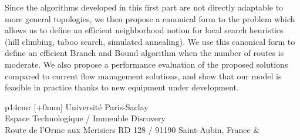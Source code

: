 \begin{mdframed}[linecolor=Prune,linewidth=1]
\begin{small}
\begin{multicols}{2}
Since the algorithms developed in this first part are not directly adaptable to more general topologies, we then propose a canonical form to the problem which allows us to define an efficient neighborhood notion for local search heuristics (hill climbing, taboo search, simulated annealing). We use this canonical form to define an efficient Branch and Bound algorithm when the number of routes is moderate.
We also propose a performance evaluation of the proposed solutions compared to current flow management solutions, and show that our model is feasible in practice thanks to new equipment under development.

\end{multicols}
\end{small}
\end{mdframed}

\vspace{5cm} %
\selectfont
\begin{tabular}{p{14cm}r}
[+0mm]{{\color{Prune} Université Paris-Saclay\\
Espace Technologique / Immeuble Discovery\\
Route de l’Orme aux Merisiers RD 128 / 91190 Saint-Aubin, France}} & \\
\end{tabular}
